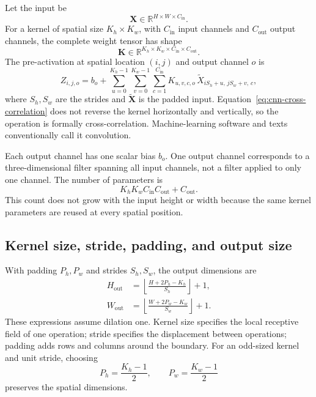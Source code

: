 Let the input be
\[
    \mathbf{X}\in
    \mathbb{R}^{H\times W\times C_{\mathrm{in}}}.
\]
For a kernel of spatial size \(K_h\times K_w\), with
\(C_{\mathrm{in}}\) input channels and \(C_{\mathrm{out}}\) output channels, the complete weight tensor has shape
\[
    \mathbf{K}\in
    \mathbb{R}^{K_h\times K_w\times
    C_{\mathrm{in}}\times C_{\mathrm{out}}}.
\]
The pre-activation at spatial location \((i,j)\) and output channel \(o\) is
\begin{equation}
    Z_{i,j,o}
    =b_o+
    \sum_{u=0}^{K_h-1}
    \sum_{v=0}^{K_w-1}
    \sum_{c=1}^{C_{\mathrm{in}}}
    K_{u,v,c,o}\,
    \widetilde{X}_{iS_h+u,\,jS_w+v,\,c},
    \label{eq:cnn-cross-correlation}
\end{equation}
where \(S_h,S_w\) are the strides and \(\widetilde{\mathbf{X}}\) is the padded input. Equation~\eqref{eq:cnn-cross-correlation} does not reverse the kernel horizontally and vertically, so the operation is formally cross-correlation. Machine-learning software and texts conventionally call it convolution.

Each output channel has one scalar bias \(b_o\). One output channel corresponds to a three-dimensional filter spanning all input channels, not a filter applied to only one channel. The number of parameters is
\begin{equation}
    K_hK_wC_{\mathrm{in}}C_{\mathrm{out}}
    +C_{\mathrm{out}}.
    \label{eq:cnn-parameter-count}
\end{equation}
This count does not grow with the input height or width because the same kernel parameters are reused at every spatial position.

\subsection{Kernel size, stride, padding, and output size}

With padding \(P_h,P_w\) and strides \(S_h,S_w\), the output dimensions are
\begin{align}
    H_{\mathrm{out}}
    &=\left\lfloor
      \frac{H+2P_h-K_h}{S_h}
      \right\rfloor+1,
    \label{eq:cnn-height}\\
    W_{\mathrm{out}}
    &=\left\lfloor
      \frac{W+2P_w-K_w}{S_w}
      \right\rfloor+1.
    \label{eq:cnn-width}
\end{align}
These expressions assume dilation one. Kernel size specifies the local receptive field of one operation; stride specifies the displacement between operations; padding adds rows and columns around the boundary. For an odd-sized kernel and unit stride, choosing
\[
    P_h=\frac{K_h-1}{2},
    \qquad
    P_w=\frac{K_w-1}{2}
\]
preserves the spatial dimensions.


